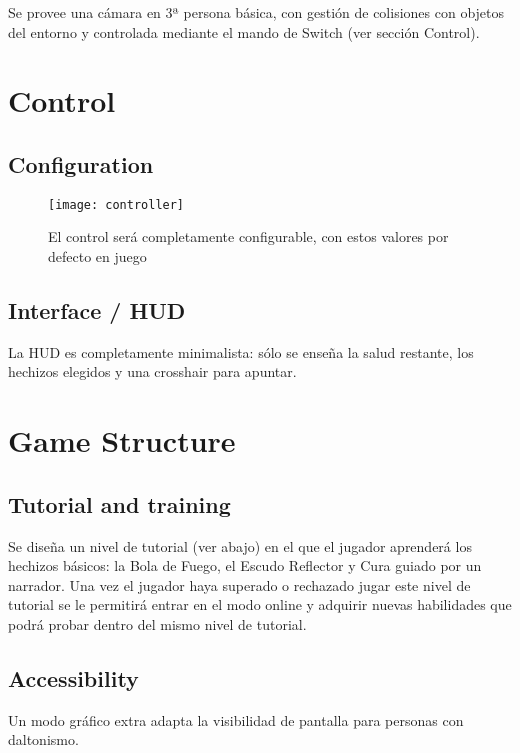 \documentclass[12pt]{article}
\begin{document}
Se provee una cámara en 3ª persona básica, con gestión de colisiones con objetos del entorno y controlada mediante el mando de Switch (ver sección Control).

\newpage      

\section{Control}

\subsection{Configuration}

\begin{figure}[h]
    \centering
    \texttt{[image: controller]}
    \caption{El control será completamente configurable, con estos valores por defecto en juego}
\end{figure}

\subsection{Interface / HUD}

La HUD es completamente minimalista: sólo se enseña la salud restante, los hechizos elegidos y una crosshair para apuntar.        

\newpage

\section{Game Structure}              

\subsection{Tutorial and training}

Se diseña un nivel de tutorial (ver abajo) en el que el jugador aprenderá los hechizos básicos: la Bola de Fuego, el Escudo Reflector y Cura guiado por un narrador. Una vez el jugador haya superado o rechazado jugar este nivel de tutorial se le permitirá entrar en el modo online y adquirir nuevas habilidades que podrá probar dentro del mismo nivel de tutorial.

\subsection{Accessibility}

Un modo gráfico extra adapta la visibilidad de pantalla para personas con daltonismo.
\end{document}
